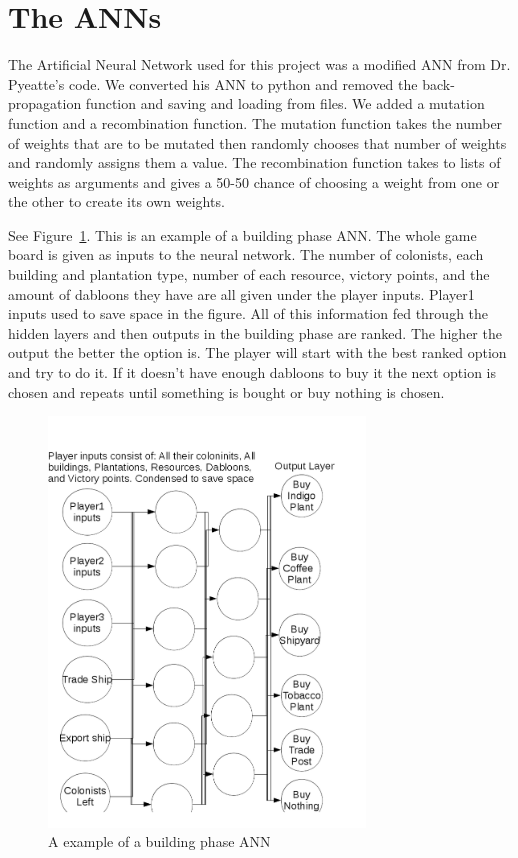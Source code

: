 \section{The ANNs }
The Artificial Neural Network used for this project was a modified ANN from Dr. Pyeatte's code. We converted his ANN to python and removed the back-propagation function and saving and loading from files. We added a mutation function and a recombination function. The mutation function takes the number of weights that are to be mutated then randomly chooses that number of weights and randomly assigns them a value. The recombination function takes to lists of weights as arguments and gives a 50-50 chance of choosing a weight from one or the other to create its own weights.

See Figure~\ref{systemdiagram}.  This is an example of a building phase ANN. The whole game board is given as inputs to the neural network. The number of colonists, each building and plantation type, number of each resource, victory points, and the amount of dabloons they have are all given under the player inputs. Player1 inputs used to save space in the figure. All of this information fed through the hidden layers and then outputs in the building phase are ranked. The higher the output the better the option is. The player will start with the best ranked option and try to do it. If it doesn't have enough dabloons to buy it the next option is chosen and repeats until something is bought or buy nothing is chosen.
\begin{figure}[tbh]
\begin{center}
\includegraphics[width=0.75\textwidth]{./images/Example_ANN.png}
\end{center}
\caption{A example of a building phase ANN \label{systemdiagram}}
\end{figure}

